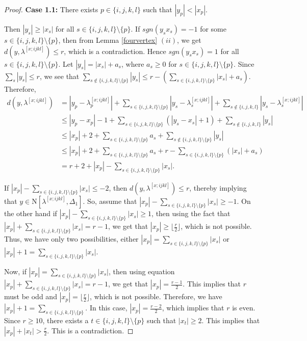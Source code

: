 \documentclass[10pt,a4paper]{amsart}
\def\n{{\mathrm{N}}}
\newcommand{\D}{\Delta}
\newcommand{\f}{\lfloor\frac{r}{2}\rfloor}
\begin{document}
\begin{proof}
	\smallskip 
	
	\noindent\textbf{Case 1.1:} There exists $p \in \{i, j, k, l\}$ such that $|y_p| < |x_p|$. 
	
	
	Then  $|y_s|\geq |x_s|$  for all $s\in \{ i, j,k,l\} \setminus \{p\}$. If  $sgn(y_sx_s)=-1$ for some $s \in \{i, j, k, l\} \setminus \{p\}$, then from Lemma \ref{fourvertex} $(ii)$, we get $d(y,\lambda^{[x;ijkl]})\leq r$,  which is a contradiction. Hence $sgn(y_sx_s)=1$ for all $s \in \{i, j, k, l\} \setminus \{p\}$. Let $|y_s|=|x_s|+a_s$, where $a_s\geq 0$ for $s \in \{i, j, k, l\} \setminus \{p\}$.  Since $\sum_{s}|y_s|\leq r$, we see that $\sum_{s\notin \{i, j,k,l\} \setminus \{p\}}|y_s|\leq r-(\sum_{s \in \{i, j, k, l \} \setminus \{p\}}|x_s|+a_s)$. Therefore,
	\begin{align*}
		d(y,\lambda^{[x;ijkl]})&=|y_p-\lambda^{[x;ijkl]}_p|+ \sum_{s \in \{i, j, k, l\}\setminus\{p\}}|y_s-\lambda^{[x;ijkl]}_s|+\sum_{s\notin\{i,j,k,l\}}|y_s-\lambda^{[x;ijkl]}_s| \\
		&\leq  |y_p-x_p|-1+ \sum_{s \in \{i, j, k, l\}\setminus\{p\}}(|y_s-x_s|+1 )+\sum_{s\notin\{i,j,k,l\}}|y_s| \\
		&\leq|x_p|+2+\sum_{s \in \{i, j, k, l\}\setminus \{p\}} a_s+\sum_{s\notin\{i, j,k,l\} \setminus \{p\}}|y_s| \\
		&\leq |x_p|+2 + \sum_{s \in \{i, j, k, l\}\setminus \{p\}} a_s+r- \sum_{s \in \{i, j, k, l\}\setminus \{p\}} (|x_s|+a_s) \\
		&= r+2+|x_p|-\sum_{s \in \{i, j, k, l\}\setminus \{p\}} |x_s|.
	\end{align*}
	
	
	If $|x_p|-\sum_{s \in \{i, j, k, l\}\setminus \{p\}} |x_s|\leq -2$, then $d(y,\lambda^{[x;ijkl]})\leq r$, thereby implying that $y \in \n[\lambda^{[x;ijkl]}, \D_1]$. So, assume that $|x_p|-\sum_{s \in \{i, j, k, l\}\setminus \{p\}} |x_s|\geq -1$. On the other hand if $|x_p|-\sum_{s \in \{i, j, k, l\}\setminus \{p\}} |x_s|\geq 1$, then using the fact that $|x_p|+\sum_{s \in \{i, j, k, l\}\setminus \{p\}} |x_s| =r-1$, we get that $|x_p|\geq \f$, which is not possible. Thus, we have only two possibilities, either $|x_p|=\sum_{s \in \{i, j, k, l\}\setminus \{p\}} |x_s|$ or $|x_p|+1=\sum_{s \in \{i, j, k, l\}\setminus \{p\}} |x_s|$.
	
	Now, if $|x_p|=\sum_{s \in \{i, j, k, l\}\setminus \{p\}} |x_s|$, then using equation $|x_p|+\sum_{s \in \{i, j, k, l\}\setminus \{p\}} |x_s| =r-1$, we get that $|x_p|=\frac{r-1}{2}$. This implies that $r$ must be odd and $|x_p|=\f$, which is not possible. 
	Therefore, we have $|x_p|+1=\sum_{s \in \{i, j, k, l\}\setminus \{p\}}$. In this case, $|x_p|=\frac{r-2}{2}$, which implies that $r$ is even. Since $r\geq 10$, there exists a $t\in \{i, j, k, l\}\setminus \{p\}$ such that $|x_t|\geq 2$. This implies that $|x_p|+|x_t|>\frac{r}{2}$. This is a contradiction.
	

\end{proof}
\end{document}
